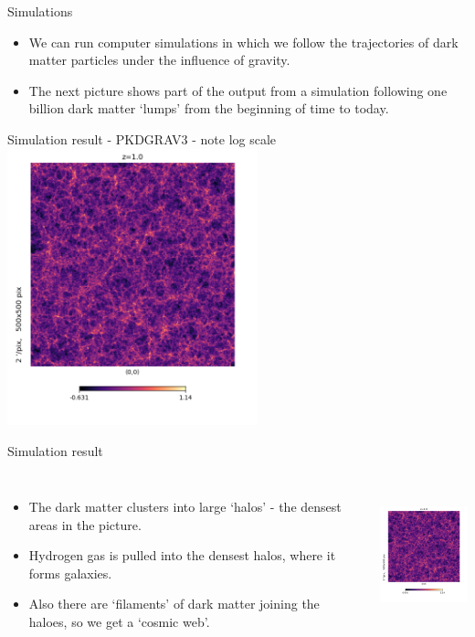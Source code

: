 \documentclass[usenames,dvipsnames]{beamer}
\begin{document}
\begin{frame}{Simulations}
  \begin{block}{}
    \begin{itemize}
      \item{We can run computer simulations in which we follow the trajectories of dark matter particles under the influence of gravity.}
	\item{The next picture shows part of the output from a simulation following one billion dark matter `lumps'  from the beginning of time to today.}
    \end{itemize}
  \end{block}
\end{frame}

\begin{frame}{Simulation result - PKDGRAV3 - note log scale}
    \centering
    \includegraphics[height=8cm]{simulation_z_1.png}
\end{frame}
  

\begin{frame}{Simulation result}
  \begin{columns}
    \begin{itemize}
      \item{The dark matter clusters into large `halos' - the densest areas in the picture.}
      \item{Hydrogen gas is pulled into the densest halos, where it forms galaxies.}
	\item{Also there are `filaments' of dark matter joining the haloes, so we get a `cosmic web'.}
    \end{itemize}
    \centering
    \includegraphics[height=4cm]{simulation_z_1.png}
  \end{columns}
\end{frame}
\end{document}
